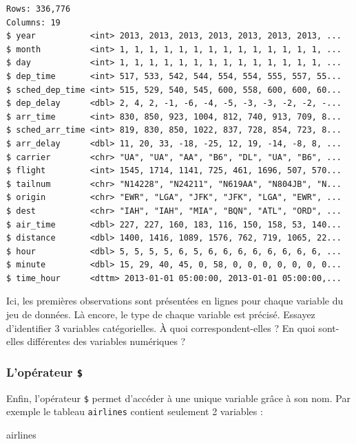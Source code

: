 \documentclass[
  a4paper,
]{article}
\newenvironment{Shaded}{\begin{snugshade}}{\end{snugshade}}
\newcommand{\NormalTok}[1]{\textcolor[rgb]{0.12,0.11,0.11}{#1}}
\begin{document}
\begin{verbatim}
Rows: 336,776
Columns: 19
$ year           <int> 2013, 2013, 2013, 2013, 2013, 2013, 2013, ...
$ month          <int> 1, 1, 1, 1, 1, 1, 1, 1, 1, 1, 1, 1, 1, 1, ...
$ day            <int> 1, 1, 1, 1, 1, 1, 1, 1, 1, 1, 1, 1, 1, 1, ...
$ dep_time       <int> 517, 533, 542, 544, 554, 554, 555, 557, 55...
$ sched_dep_time <int> 515, 529, 540, 545, 600, 558, 600, 600, 60...
$ dep_delay      <dbl> 2, 4, 2, -1, -6, -4, -5, -3, -3, -2, -2, -...
$ arr_time       <int> 830, 850, 923, 1004, 812, 740, 913, 709, 8...
$ sched_arr_time <int> 819, 830, 850, 1022, 837, 728, 854, 723, 8...
$ arr_delay      <dbl> 11, 20, 33, -18, -25, 12, 19, -14, -8, 8, ...
$ carrier        <chr> "UA", "UA", "AA", "B6", "DL", "UA", "B6", ...
$ flight         <int> 1545, 1714, 1141, 725, 461, 1696, 507, 570...
$ tailnum        <chr> "N14228", "N24211", "N619AA", "N804JB", "N...
$ origin         <chr> "EWR", "LGA", "JFK", "JFK", "LGA", "EWR", ...
$ dest           <chr> "IAH", "IAH", "MIA", "BQN", "ATL", "ORD", ...
$ air_time       <dbl> 227, 227, 160, 183, 116, 150, 158, 53, 140...
$ distance       <dbl> 1400, 1416, 1089, 1576, 762, 719, 1065, 22...
$ hour           <dbl> 5, 5, 5, 5, 6, 5, 6, 6, 6, 6, 6, 6, 6, 6, ...
$ minute         <dbl> 15, 29, 40, 45, 0, 58, 0, 0, 0, 0, 0, 0, 0...
$ time_hour      <dttm> 2013-01-01 05:00:00, 2013-01-01 05:00:00,...
\end{verbatim}

Ici, les premières observations sont présentées en lignes pour chaque variable du jeu de données. Là encore, le type de chaque variable est précisé. Essayez d'identifier 3 variables catégorielles. À quoi correspondent-elles ? En quoi sont-elles différentes des variables numériques ?

\hypertarget{lopuxe9rateur}{%
\subsubsection{\texorpdfstring{L'opérateur \texttt{\$}}{L'opérateur \$}}\label{lopuxe9rateur}}

Enfin, l'opérateur \texttt{\$} permet d'accéder à une unique variable grâce à son nom. Par exemple le tableau \texttt{airlines} contient seulement 2 variables :

\begin{Shaded}
\begin{Highlighting}[]
\NormalTok{airlines}
\end{Highlighting}
\end{Shaded}
\end{document}
